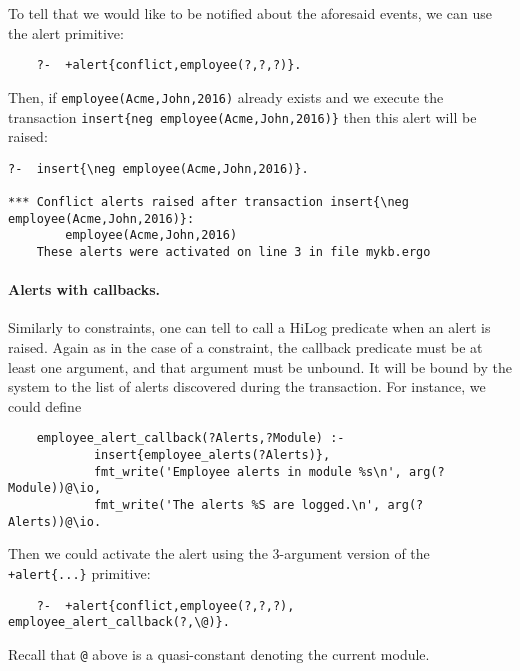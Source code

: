 To tell \ERGO that we would like to be notified about the aforesaid events,
we can use the alert primitive:
\begin{verbatim}
    ?-  +alert{conflict,employee(?,?,?)}.
\end{verbatim}
Then, if \texttt{employee(Acme,John,2016)} already exists and we execute
the transaction \texttt{insert\{\bs{}neg employee(Acme,John,2016)\}} then
this alert will be raised:
\begin{verbatim}
?-  insert{\neg employee(Acme,John,2016)}.

*** Conflict alerts raised after transaction insert{\neg employee(Acme,John,2016)}:
        employee(Acme,John,2016)
    These alerts were activated on line 3 in file mykb.ergo
\end{verbatim}

\paragraph{Alerts with callbacks.}
Similarly to constraints, one can tell \ERGO to call a HiLog predicate when
an alert is raised. Again as in the case of a constraint, the callback
predicate must be at least one argument, and that argument must be unbound.
It will be bound by the system to the list of alerts discovered during the
transaction. 
For instance, we could define
\begin{verbatim}
    employee_alert_callback(?Alerts,?Module) :-
            insert{employee_alerts(?Alerts)},
            fmt_write('Employee alerts in module %s\n', arg(?Module))@\io,
            fmt_write('The alerts %S are logged.\n', arg(?Alerts))@\io.
\end{verbatim}
Then we could activate the alert using the 3-argument version of the
\texttt{+alert\{...\}} primitive:
\begin{verbatim}
    ?-  +alert{conflict,employee(?,?,?), employee_alert_callback(?,\@)}.
\end{verbatim}
Recall that \texttt{\bs{}@} above is a quasi-constant denoting the current
module. 

